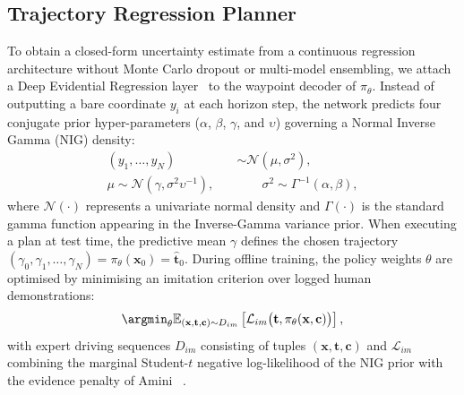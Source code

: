 \subsection{Trajectory Regression Planner}\label{centaur:app:regression}

To obtain a closed-form uncertainty estimate from a continuous regression architecture without Monte Carlo dropout or multi-model ensembling, we attach a Deep Evidential Regression layer~\cite{amini2020deepevidential} to the waypoint decoder of $\pi_\theta$. Instead of outputting a bare coordinate $y_i$ at each horizon step, the network predicts four conjugate prior hyper-parameters ($\alpha$, $\beta$, $\gamma$, and $\upsilon$) governing a Normal Inverse Gamma (NIG) density:
\begin{align}
  (y_1, \dots, y_N) &\sim \mathcal{N}(\mu, \sigma^2), \nonumber \\
  \mu \sim \mathcal{N}(\gamma, \sigma^2 \upsilon^{-1}), \quad & \qquad \sigma^2 \sim \Gamma^{-1}(\alpha, \beta),
  \label{centaur:eq:evidential}
\end{align}
where $\mathcal{N}(\cdot)$ represents a univariate normal density and $\Gamma(\cdot)$ is the standard gamma function appearing in the Inverse-Gamma variance prior. When executing a plan at test time, the predictive mean $\gamma$ defines the chosen trajectory $(\gamma_0, \gamma_1, \dots, \gamma_N) = \pi_\theta(\mathbf{x}_0) = \hat{\mathbf{t}}_0$. During offline training, the policy weights $\theta$ are optimised by minimising an imitation criterion over logged human demonstrations:
\begin{equation}
  \label{centaur:eq:objective}
  \argmin_{\theta} \mathbb{E}_{(\mathbf{x},\mathbf{t},\mathbf{c})\sim D_{im}} \left[\mathcal{L}_{im}\big(\mathbf{t}, \pi_\theta(\mathbf{x},\mathbf{c})\big)\right],
\end{equation}
with expert driving sequences $D_{im}$ consisting of tuples $(\mathbf{x},\mathbf{t},\mathbf{c})$ and $\mathcal{L}_{im}$ combining the marginal Student-$t$ negative log-likelihood of the NIG prior with the evidence penalty of Amini \etal~\cite{amini2020deepevidential}.

